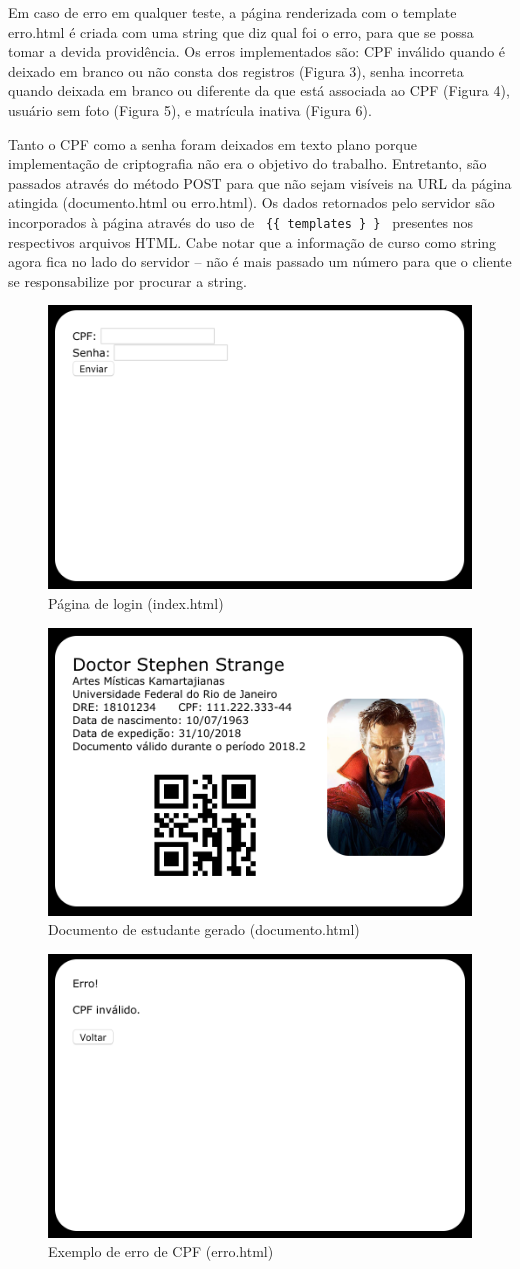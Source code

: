\documentclass[12pt]{article}
\def\code #1{\texttt{#1}}
\begin{document}
Em caso de erro em qualquer teste, a página renderizada com o template erro.html é criada com uma string que diz qual foi o erro, para que se possa tomar a devida providência. Os erros implementados são: CPF inválido quando é deixado em branco ou não consta dos registros (Figura 3), senha incorreta quando deixada em branco ou diferente da que está associada ao CPF (Figura 4), usuário sem foto (Figura 5), e matrícula inativa (Figura 6).

Tanto o CPF como a senha foram deixados em texto plano porque implementação de criptografia não era o objetivo do trabalho. Entretanto, são passados através do método POST para que não sejam visíveis na URL da página atingida (documento.html ou erro.html). Os dados retornados pelo servidor são incorporados à página através do uso de \code{ \{\{ templates \} \} } presentes nos respectivos arquivos HTML. Cabe notar que a informação de curso como string agora fica no lado do servidor -- não é mais passado um número para que o cliente se responsabilize por procurar a string.

\begin{figure}[ht]
\centering
\includegraphics[width=.5\textwidth]{fig1.png}
\caption{Página de login (index.html)}
\label{fig:exampleFig1}
\end{figure}

\begin{figure}[ht]
\centering
\includegraphics[width=.5\textwidth]{fig2.png}
\caption{Documento de estudante gerado (documento.html)}
\label{fig:exampleFig2}
\end{figure}

\begin{figure}[ht]
\centering
\includegraphics[width=.5\textwidth]{fig3.png}
\caption{Exemplo de erro de CPF (erro.html)}
\label{fig:exampleFig3}
\end{figure}
\end{document}
